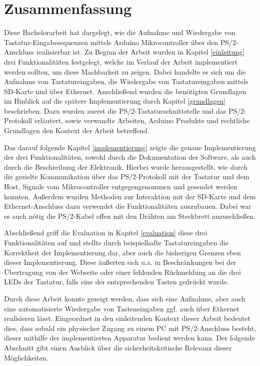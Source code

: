 \chapter{Zusammenfassung}
\label{zusammenfassung}
Diese Bachelorarbeit hat dargelegt, wie die Aufnahme und Wiedergabe von Tastatur-Eingabesequenzen mittels Arduino Mikrocontroller über den PS/2-Anschluss realisierbar ist. Zu Beginn der Arbeit wurden in Kapitel \ref{einleitung} drei Funktionalitäten festgelegt, welche im Verlauf der Arbeit implementiert werden sollten, um diese Machbarkeit zu zeigen. Dabei handelte es sich um die Aufnahme von Tastatureingaben, die Wiedergabe von Tastatureingaben mittels SD-Karte und über Ethernet. Anschließend wurden die benötigten Grundlagen im Hinblick auf die spätere Implementierung durch Kapitel \ref{grundlagen} beschrieben. Dazu wurden zuerst die PS/2-Tastaturschnittstelle und das PS/2-Protokoll erläutert, sowie verwandte Arbeiten, Arduino Produkte und rechtliche Grundlagen den Kontext der Arbeit betreffend.

Das darauf folgende Kapitel \ref{implementierung} zeigte die genaue Implementierung der drei Funktionalitäten, sowohl durch die Dokumentation der Software, als auch durch die Beschreibung der Elektronik. Hierbei wurde herausgestellt, wie durch die gezielte Kommunikation über das PS/2-Protokoll mit der Tastatur und dem Host, Signale vom Mikrocontroller entgegengenommen und gesendet werden konnten. Außerdem wurden Methoden zur Interaktion mit der SD-Karte und dem Ethernet-Anschluss dazu verwendet die Funktionalitäten auszubauen. Dabei war es auch nötig die PS/2-Kabel offen mit den Drähten am Steckbrett anzuschließen.

Abschließend griff die Evaluation in Kapitel \ref{evaluation} diese drei Funktionalitäten auf und stellte durch beispielhafte Tastatureingaben die Korrektheit der Implementierung dar, aber auch die bisherigen Grenzen eben dieser Implementierung. Diese äußerten sich u.a. in Beschränkungen bei der Übertragung von der Webseite oder einer fehlenden Rückmeldung an die drei LEDs der Tastatur, falls eine der entsprechenden Tasten gedrückt wurde.

Durch diese Arbeit konnte gezeigt werden, dass sich eine Aufnahme, aber auch eine automatisierte Wiedergabe von Tasteneingaben ggf. auch über Ethernet realisieren lässt. Eingeordnet in den einleitenden Kontext dieser Arbeit bedeutet dies, dass sobald ein physischer Zugang zu einem PC mit PS/2-Anschluss besteht, dieser mithilfe der implementierten Apparatur bedient werden kann. Der folgende Abschnitt gibt einen Ausblick über die sicherheitskritische Relevanz dieser Möglichkeiten.



